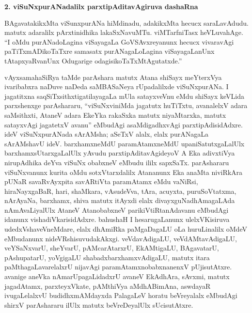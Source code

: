 \bigskip
\begin{center}
{\Large\bf 2. viSuNxpurANadalilx parxtipAditavAgiruva dashaRna}
\end{center}

BAgavatakikxMta viSunxpurANa hiMdinadu, adakikxMta hecucx saraLavAdudu. matutx adaralilx pArxtinidhika lakaSxNavuMTu. viMTarfniTasx heVLuvahAge. ``I oMdu purANa\-doLagina viSayagaLa GoVSAvxreyanunx hecucx vivaravAgi paTiTxmADikoTaTxre samasatx purANagaLoLagina viSayagaLanUnx tAtapxyaRvanUnx Odugarige odagisikoTaTxMtAgu\-tatxde.''

vAyxsamahaSiRya taMde parAshara matutx Atana shiSayx meYterxVya ivaribabxra naDuve naDeda saMBASaNeya rUpadalilxde viSuNxpurANa. I jagatitxna saqSiTxsithxtigatilayagaLa mUla satayxveVnu eMdu shiSayx keVLida parxshenxge parAshararu, ``viSuNxviniMda jagatutx huTiTxtu, avanalelxV adara saMsithxti, AtaneV adara EkeYka rakaSxka matutx niyaMtarxka, matutx satayx\-vAgi jagatetxV avanu'' eMbudAgi asaMdigadhxvAgi parxtipAdisidAdxre. ideV viSuNxpurANada sArAMsha; aSeTxV alalx, elalx purANagaLa sArAMshavU ideV. barxhamxneMdU paramAtamx\-neMdU upaniSatutxgaLalUlx barxhamxsUtarxgaLalUlx yAvudu parxtipAditavAgideyoV A Eka adivxtiVya nirupAdhika deYva viSuNx obabxneV eMbudu ililx sapxSaTx. parAshararu viSuNx\-vanunx kurita oMdu sotxVtarxdalilx Atananunx Eka anaMta niviRkAra pUNaR savaR\-vAyxpita savARtiVta paramAtamx eMdu vaNiRsi, hiraNayxgaBaR, hari, shaMkara, vAsudeVva, tAra, acuyxta, puruSoVtatxma, nArAyaNa, barxhamx, shiva matutx itAyxdi elalx divayxguNa\-dhAma\-gaLAda nAmAvaLiyalUlx AtaneV AtanobabxneV parikiVtiRtanAdavanu eMbudAgi idanunx vishadiVkarisidAdxre. bahushaH I hesarugaLanunx ulelxVKisiruva udedxVsha\-veVneMdare, elalx dhAmiRka paMgaDagaLU oLa huruLinalilx oMdeV eMbudanunx nideVR\-shisuvudakAkxgi. veVdavAdigaLU, veVdAMtavAdigaLU, veYSaNxvarU, sheYvarU, pAMca\-rAtarxrU, EkAMtigaLU, BAgavatarU, pAshupatarU, yoVgigaLU shabadxbarxhamxvAdi\-gaLU, matutx itara paMthagaLavarelalxrU nijavAgi paramAtamxnobabxnanenxV pUjisutAtxre. avanige aneVka nAmarUpagaLidadxrU avaneV EkAdhAra, sAvxmi, matutx jagadAtamx, parxteyxVkate, pAMthiVya aMdhABimAna, aswdayaR ivugaLelalxvU budidhxmAMdayxda PalagaLeV horatu beVreyalalx eMbudAgi shirxV parAshararu ilUlx matutx beVreDeyalUlx sUcisutAtxre.

